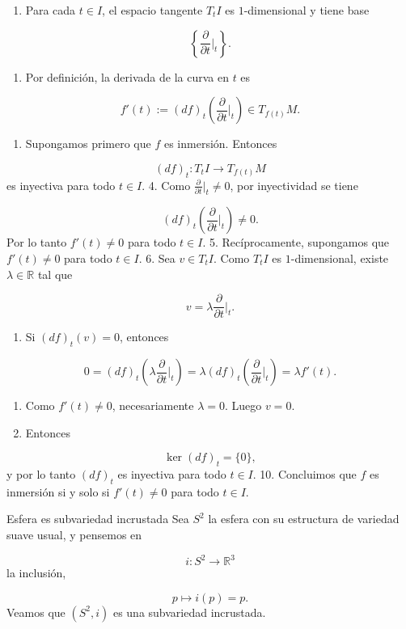 \begin{bookproof}{}
\begin{enumerate}
\item Para cada $t\in I$, el espacio tangente $T_tI$ es $1$-dimensional y tiene base
\end{enumerate}
\[
\left\{\frac{\partial}{\partial t}\bigg|_t\right\}.
\]
\begin{enumerate}[start=2]
\item Por definición, la derivada de la curva en $t$ es
\end{enumerate}
\[
f'(t):=(df)_t\left(\frac{\partial}{\partial t}\bigg|_t\right)\in T_{f(t)}M.
\]
\begin{enumerate}[start=3]
\item Supongamos primero que $f$ es inmersión. Entonces
\end{enumerate}
\[
(df)_t:T_tI\to T_{f(t)}M
\]
es inyectiva para todo $t\in I$. 4. Como $\frac{\partial}{\partial t}\big|_t\neq 0$, por inyectividad se tiene

\[
(df)_t\left(\frac{\partial}{\partial t}\bigg|_t\right)\neq 0.
\]
Por lo tanto $f'(t)\neq 0$ para todo $t\in I$. 5. Recíprocamente, supongamos que $f'(t)\neq 0$ para todo $t\in I$. 6. Sea $v\in T_tI$. Como $T_tI$ es $1$-dimensional, existe $\lambda\in\mathbb R$ tal que

\[
v=\lambda\frac{\partial}{\partial t}\bigg|_t.
\]
\begin{enumerate}[start=7]
\item Si $(df)_t(v)=0$, entonces
\end{enumerate}
\[
0=(df)_t\left(\lambda\frac{\partial}{\partial t}\bigg|_t\right)=\lambda (df)_t\left(\frac{\partial}{\partial t}\bigg|_t\right)=\lambda f'(t).
\]
\begin{enumerate}[start=8]
\item Como $f'(t)\neq 0$, necesariamente $\lambda=0$. Luego $v=0$.
\item Entonces
\end{enumerate}
\[
\ker(df)_t=\{0\},
\]
y por lo tanto $(df)_t$ es inyectiva para todo $t\in I$. 10. Concluimos que $f$ es inmersión si y solo si $f'(t)\neq 0$ para todo $t\in I$.

\bookqed
\end{bookproof}
\begin{bookexample}{Esfera es subvariedad incrustada}
Sea $S^2$ la esfera con su estructura de variedad suave usual, y pensemos en

\[
i:S^2\to\mathbb R^3
\]
la inclusión,

\[
p\mapsto i(p)=p.
\]
Veamos que $(S^2,i)$ es una subvariedad incrustada.

\end{bookexample}
